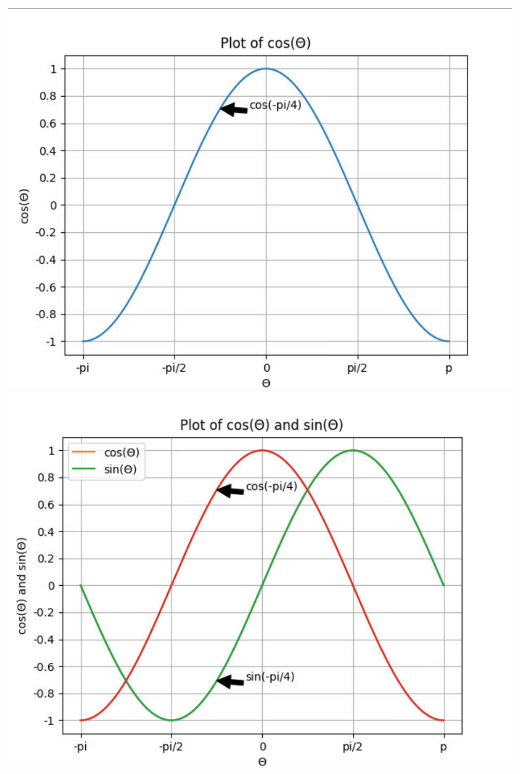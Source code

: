 \documentclass{article}
\begin{document}
\begin{center}
\includegraphics[width=.9\linewidth]{IMAGE.png}\\
[\baselineskip]
\includegraphics[width=.9
\linewidth]{IMAGE1.png}
\end{center}
\end{document}
